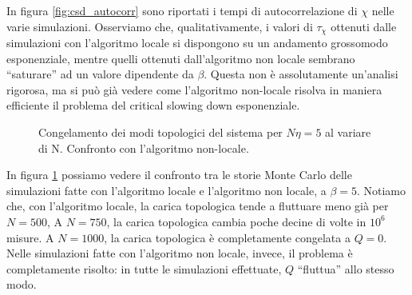 \documentclass[a4paper,11pt]{article}
\begin{document}
    
    In figura \ref{fig:csd_autocorr} sono riportati i tempi di autocorrelazione di $\chi$ nelle varie simulazioni. Osserviamo che, qualitativamente, i valori di $\tau_\chi$ ottenuti dalle simulazioni con l'algoritmo locale si dispongono su un andamento grossomodo esponenziale, mentre quelli ottenuti dall'algoritmo non locale sembrano ``saturare'' ad un valore dipendente da $\beta$. Questa non è assolutamente un'analisi rigorosa, ma si può già vedere come l'algoritmo non-locale risolva in maniera efficiente il problema del critical slowing down esponenziale.
    
    \begin{figure}[htb]
        \centering
        \caption{Congelamento dei modi topologici del sistema per $N\eta = 5$ al variare di N. Confronto con l'algoritmo non-locale.}
        \label{fig:csd_topfreezing}
    \end{figure}
    
    In figura \ref{fig:csd_topfreezing} possiamo vedere il confronto tra le storie Monte Carlo delle simulazioni fatte con l'algoritmo locale e l'algoritmo non locale, a $\beta = 5$. Notiamo che, con l'algoritmo locale, la carica topologica tende a fluttuare meno già per $N = 500$, A $N = 750$, la carica topologica cambia poche decine di volte in $10^6$ misure. A $N = 1000$, la carica topologica è completamente congelata a $Q = 0$. Nelle simulazioni fatte con l'algoritmo non locale, invece, il problema è completamente risolto: in tutte le simulazioni effettuate, $Q$ ``fluttua'' allo stesso modo.
    
\end{document}
